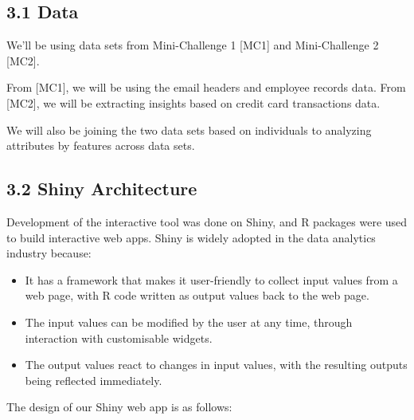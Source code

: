 \documentclass{acm_proc_article-sp}
\providecommand{\tightlist}{%
  \setlength{\itemsep}{0pt}\setlength{\parskip}{0pt}}
\begin{document}
\hypertarget{data}{%
\subsection{3.1 Data}\label{data}}

We'll be using data sets from Mini-Challenge 1 {[}MC1{]} and Mini-Challenge 2 {[}MC2{]}.

From {[}MC1{]}, we will be using the email headers and employee records data. From {[}MC2{]}, we will be extracting insights based on credit card transactions data.

We will also be joining the two data sets based on individuals to analyzing attributes by features across data sets.

\hypertarget{shiny-architecture}{%
\subsection{3.2 Shiny Architecture}\label{shiny-architecture}}

Development of the interactive tool was done on Shiny, and R packages were used to build interactive web apps. Shiny is widely adopted in the data analytics industry because:

\begin{itemize}
\tightlist
\item
  It has a framework that makes it user-friendly to collect input values from a web page, with R code written as output values back to the web page.
\item
  The input values can be modified by the user at any time, through interaction with customisable widgets.
\item
  The output values react to changes in input values, with the resulting outputs being reflected immediately.
\end{itemize}

The design of our Shiny web app is as follows:
\end{document}
